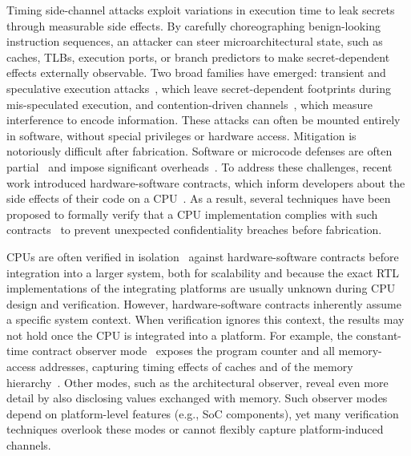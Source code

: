
Timing side-channel attacks exploit variations in execution time to leak secrets through measurable side effects.
By carefully choreographing benign-looking instruction sequences, an attacker can steer microarchitectural state, such as caches, TLBs, execution ports, or branch predictors to make secret-dependent effects externally observable.
Two broad families have emerged: transient and speculative execution attacks~\cite{kocher2019spectre,lipp2018meltdown,van2019ridl,ragab2021rage,wikner2022retbleed,wikner2025bpi}, which leave secret-dependent footprints during mis-speculated execution, and contention-driven channels~\cite{bernstein2005cache,Liu2015LLC,YaromFalkner2014FlushReload,Yarom2016CacheBleed,Moghimi2018MemJam,Gruss2016PrefetchSCA}, which measure interference to encode information.
These attacks can often be mounted entirely in software, without special privileges or hardware access.
Mitigation is notoriously difficult after fabrication.
Software or microcode defenses are often partial~\cite{ridlad} and impose significant overheads~\cite{herzog2021price}.
% 
To address these challenges, recent work introduced hardware-software contracts, which inform developers about the side effects of their code on a CPU~\cite{guarnieri2021hardware,oleksenko2022revizor}.
As a result, several techniques have been proposed to formally verify that a CPU implementation complies with such contracts~\cite{dinesh2024conjunct,dinesh2025h,ceesay2024mucfi,wang2023specification,tan2025contractshadowlogic,hsiao2024rtl2mmupath} to prevent unexpected confidentiality breaches before fabrication.

CPUs are often verified in isolation~\cite{dinesh2024conjunct,dinesh2025h,ceesay2024mucfi,wang2023specification,tan2025contractshadowlogic,hsiao2024rtl2mmupath} against hardware-software contracts before integration into a larger system, both for scalability and because the exact RTL implementations of the integrating platforms are usually unknown during CPU design and verification.
However, hardware-software contracts inherently assume a specific system context. When verification ignores this context, the results may not hold once the CPU is integrated into a platform.
For example, the constant-time contract observer mode~\cite{guarnieri2021hardware} exposes the program counter and all memory-access addresses, capturing timing effects of caches and of the memory hierarchy~\cite{guarnieri2021hardware,oleksenko2022revizor}.
Other modes, such as the architectural observer, reveal even more detail by also disclosing values exchanged with memory.
Such observer modes depend on platform-level features (e.g., SoC components), yet many verification techniques overlook these modes or cannot flexibly capture platform-induced channels.

